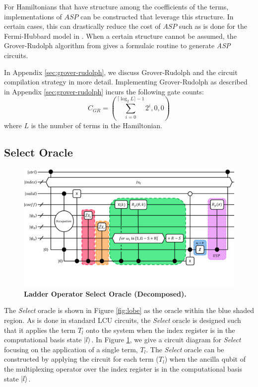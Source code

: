 For Hamiltonians that have structure among the coefficients of the terms, implementations of $\textit{ASP}$ can be constructed that leverage this structure.
In certain cases, this can drastically reduce the cost of $\textit{ASP}$ such as is done for the Fermi-Hubbard model in \cite{babbush2018encoding}.
When a certain structure cannot be assumed, the Grover-Rudolph algorithm from \cite{grover2002creating} gives a formulaic routine to generate \textit{ASP} circuits.

In Appendix \ref{sec:grover-rudolph}, we discuss Grover-Rudolph and the circuit compilation strategy in more detail.
Implementing Grover-Rudolph as described in Appendix \ref{sec:grover-rudolph} incurs the following gate counts:
\begin{equation}
    C_{GR} = (\sum_{i=0}^{\lceil \log_2{L} \rceil - 1} 2^i, 0, 0)
\end{equation}
where $L$ is the number of terms in the Hamiltonian.

\subsection{Select Oracle}
\label{subsec:select}

\begin{figure}
    \centering
    \includegraphics[width=16cm]{figures/select.pdf}
    \caption{\textbf{Ladder Operator Select Oracle (Decomposed).}
    }
    \label{fig:select}
\end{figure}

The \textit{Select} oracle is shown in Figure \ref{fig:lobe} as the oracle within the blue shaded region.
As is done in standard LCU circuits, the \textit{Select} oracle is designed such that it applies the term $T_l$ onto the system when the index register is in the computational basis state $\ket{l}$.
In Figure \ref{fig:select}, we give a circuit diagram for \textit{Select} focusing on the application of a single term, $T_l$.
The \textit{Select} oracle can be constructed by applying the circuit for each term ($T_l$) when the ancilla qubit of the multiplexing operator over the index register is in the computational basis state $\ket{l}$.

